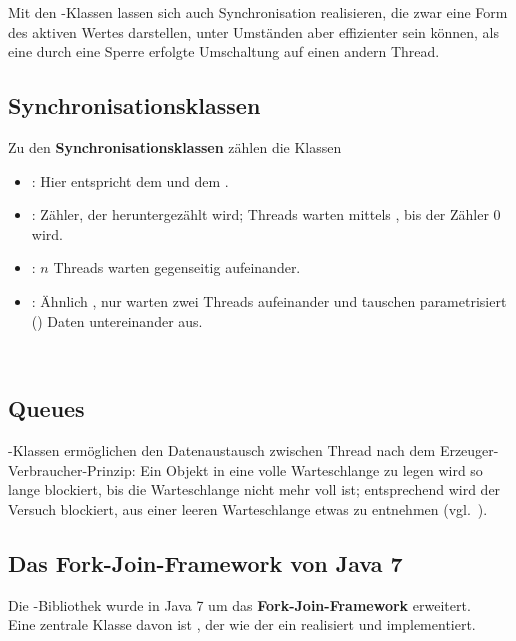 \noindent
Mit den -Klassen lassen sich auch  Synchronisation realisieren, die zwar eine Form des aktiven Wertes darstellen, unter Umständen aber effizienter sein können, als eine durch eine Sperre erfolgte Umschaltung auf einen andern Thread.\\

\subsection*{Synchronisationsklassen}
Zu den \textbf{Synchronisationsklassen} zählen die Klassen
\begin{itemize}
    \item {}: Hier entspricht  dem  und  dem .
    \item {}: Zähler, der heruntergezählt wird; Threads warten mittels , bis der Zähler $0$ wird.
    \item {}: $n$ Threads warten gegenseitig aufeinander.
    \item {}: Ähnlich , nur warten zwei Threads aufeinander und tauschen parametrisiert () Daten untereinander aus.
\end{itemize}\\

\subsection*{Queues}
-Klassen ermöglichen den  Datenaustausch zwischen Thread nach dem Erzeuger-Verbraucher-Prinzip: Ein Objekt in eine volle Warteschlange zu legen wird so lange blockiert, bis die Warteschlange nicht mehr voll ist; entsprechend wird der Versuch blockiert, aus einer leeren Warteschlange etwas zu entnehmen (vgl.~\cite[164]{Oec22}).

\subsection{Das Fork-Join-Framework von Java 7}

Die -Bibliothek wurde in Java 7 um das \textbf{Fork-Join-Framework} erweitert.\\

\noindent
Eine zentrale Klasse davon ist , der wie der  ein  realisiert und  implementiert.\\

